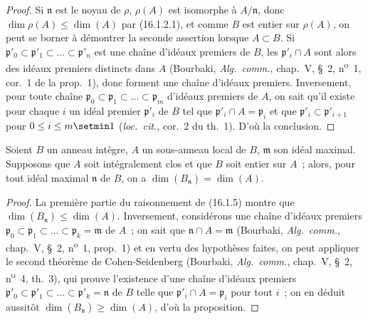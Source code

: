 \begin{proof}
Si $\mathfrak{n}$ est le noyau de $\rho$, $\rho(A)$ est isomorphe à
$A/\mathfrak{n}$, donc $\dim\rho(A)\leq\dim(A)$ par (16.1.2.1), et comme $B$
est entier sur $\rho(A)$, on peut se borner à démontrer la seconde assertion
lorsque $A\subset B$. Si
$\mathfrak{p}'_0\subset\mathfrak{p}'_1\subset\ldots\subset\mathfrak{p}'_n$
est une chaîne d'idéaux premiers de $B$, les $\mathfrak{p}'_i\cap A$ sont
alors des idéaux premiers distincts dans $A$ (Bourbaki, \emph{Alg.~comm.},
chap.~V, \S~2, n\textsuperscript{o}~1, cor.~1 de la prop.~1), donc forment une chaîne d'idéaux
premiers. Inversement, pour toute chaîne
$\mathfrak{p}_0\subset\mathfrak{p}_1\subset\ldots\subset\mathfrak{p}_m$
d'idéaux premiers de $A$, on sait qu'il existe pour chaque $i$ un idéal
premier $\mathfrak{p}'_i$ de $B$ tel que
$\mathfrak{p}'_i\cap A=\mathfrak{p}_i$ et que
$\mathfrak{p}'_i\subset\mathfrak{p}'_{i+1}$ pour $0\leq i\leq m\setmin 1$
(\emph{loc.~cit.}, cor.~2 du th.~1). D'où la conclusion.
\end{proof}

\begin{proposition}[16.1.6]
\label{0.16.1.6-fr}
Soient $B$ un anneau intègre, $A$ un sous-anneau local de $B$,
$\mathfrak{m}$ son idéal maximal. Supposons que $A$ soit intégralement clos et
que $B$ soit entier sur $A$~; alors, pour tout idéal maximal $\mathfrak{n}$ de
$B$, on a $\dim(B_{\mathfrak{n}})=\dim(A)$.
\end{proposition}

\begin{proof}
La première partie du raisonnement de (16.1.5) montre que
$\dim(B_{\mathfrak{n}})\leq\dim(A)$. Inversement, considérons une chaîne
d'idéaux premiers
$\mathfrak{p}_0\subset\mathfrak{p}_1\subset\ldots\subset
\mathfrak{p}_k=\mathfrak{m}$ de $A$~; on sait que
$\mathfrak{n}\cap A=\mathfrak{m}$ (Bourbaki, \emph{Alg.~comm.}, chap.~V,
\S~2, n\textsuperscript{o}~1, prop.~1) et en vertu des hypothèses faites, on peut appliquer le
second théorème de Cohen-Seidenberg (Bourbaki, \emph{Alg.~comm.}, chap.~V,
\S~2, n\textsuperscript{o}~4, th.~3), qui prouve l'existence d'une chaîne d'idéaux premiers
$\mathfrak{p}'_0\subset\mathfrak{p}'_1\subset\ldots\subset
\mathfrak{p}'_k=\mathfrak{n}$ de $B$ telle que
$\mathfrak{p}'_i\cap A=\mathfrak{p}_i$ pour tout $i$~; on en déduit aussitôt
$\dim(B_{\mathfrak{n}})\geq\dim(A)$, d'où la proposition.
\end{proof}

